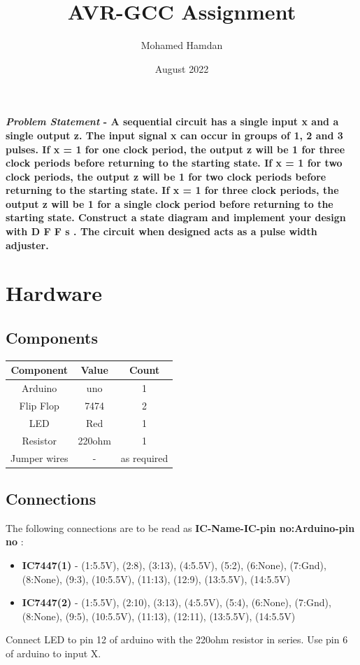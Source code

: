 \documentclass[journal,10pt,twocolumn]{article}
\title{\textbf{AVR-GCC Assignment}}
\author{Mohamed Hamdan}
\date{August 2022}
\begin{document}
\maketitle
\paragraph{\textit{Problem Statement} - A sequential circuit has a single input x and a single output z. The input signal x can occur in groups of 1, 2 and 3 pulses. If x = 1 for one clock period, the output z will be 1 for three clock periods before returning to the starting state. If x = 1 for two clock periods, the output z will be 1 for two clock periods before returning to the starting state. If x = 1 for three clock periods, the output z will be 1 for a single clock period before returning to the starting state. Construct a state diagram and implement your design with D F F s . The circuit when designed acts as a pulse width adjuster.
}

\section*{\large Hardware}
\subsection*{\normalsize Components}
{
\centering
\begin{tabular}{|c|c|c|}
\hline
Component&Value&Count\\
\hline
Arduino&uno&1\\
\hline
Flip Flop&7474&2\\
\hline
LED&Red&1\\
\hline
Resistor&220ohm&1\\
\hline
Jumper wires&-&as required\\
\hline
\end{tabular}\par
}
\subsection*{\normalsize Connections}
The following connections are to be read as \textbf{IC-Name-IC-pin no:Arduino-pin no} :
\begin{itemize}
\item \textbf{IC7447(1)} - (1:5.5V), (2:8), (3:13), (4:5.5V), (5:2), (6:None), (7:Gnd), (8:None), (9:3), (10:5.5V), (11:13), (12:9), (13:5.5V), (14:5.5V)
\item \textbf{IC7447(2)} - (1:5.5V), (2:10), (3:13), (4:5.5V), (5:4), (6:None), (7:Gnd), (8:None), (9:5), (10:5.5V), (11:13), (12:11), (13:5.5V), 
 (14:5.5V)
\end{itemize}
Connect LED to pin 12 of arduino with the 220ohm resistor in series. Use pin 6 of arduino to input X.
\end{document}
